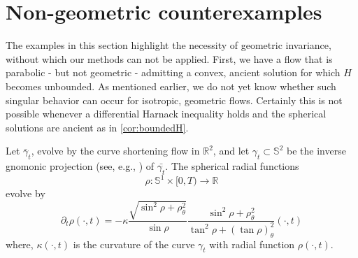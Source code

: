 \documentclass{amsart}
\begin{document}
\section{Non-geometric counterexamples}\label{sec: examples}
The examples in this section highlight the necessity of geometric invariance, without which our methods can not be applied. First, we have a flow that is parabolic - but not geometric - admitting a convex, ancient solution for which \(H\) becomes unbounded. As mentioned earlier, we do not yet know whether such singular behavior can occur for isotropic, geometric flows. Certainly this is not possible whenever a differential Harnack inequality holds and the spherical solutions are ancient as in \cref{cor:boundedH}.
\begin{example}
Let $\bar{\gamma}_t$, evolve by the curve shortening flow in $\mathbb{R}^2$, and let $\gamma_t \subset \mathbb{S}^2$ be the inverse gnomonic projection (see, e.g., \cite{BesauWerner:11/2014}) of \(\bar{\gamma_t}\). The spherical radial functions
\[\rho:\mathbb{S}^1\times[0,T)\to \mathbb{R}\]
evolve by
\begin{equation}\label{eq: angenent oval}
\partial_t\rho(\cdot,t)=-\kappa \frac{\sqrt{\sin^2\rho+\rho_{\theta}^2}}{\sin\rho}\frac{\sin^2\rho+\rho_{\theta}^2}{\tan^2\rho+(\tan\rho)_{\theta}^2}(\cdot,t)
\end{equation}
where, $\kappa(\cdot,t)$ is the curvature of the curve $\gamma_t$ with radial function $\rho(\cdot,t).$


\end{example}
\end{document}
